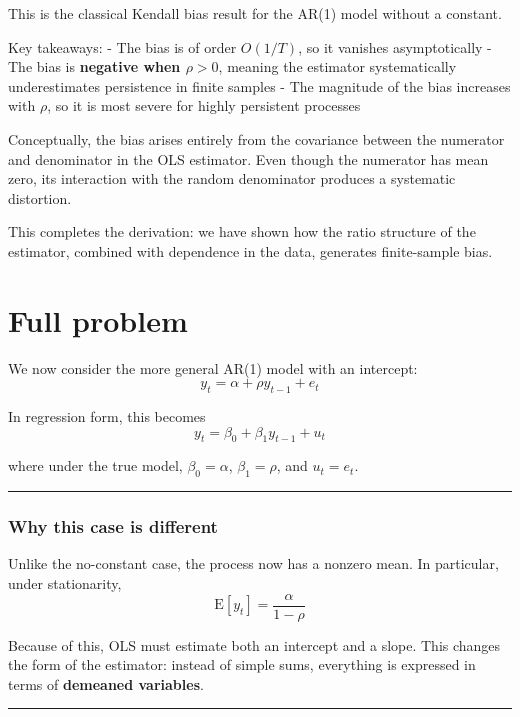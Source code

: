\documentclass[11pt]{article}
\begin{document}
This is the classical Kendall bias result for the AR(1) model without a
constant.

Key takeaways: - The bias is of order \(O(1/T)\), so it vanishes
asymptotically - The bias is \textbf{negative when \(\rho > 0\)},
meaning the estimator systematically underestimates persistence in
finite samples - The magnitude of the bias increases with \(\rho\), so
it is most severe for highly persistent processes

Conceptually, the bias arises entirely from the covariance between the
numerator and denominator in the OLS estimator. Even though the
numerator has mean zero, its interaction with the random denominator
produces a systematic distortion.

This completes the derivation: we have shown how the ratio structure of
the estimator, combined with dependence in the data, generates
finite-sample bias.

    \section{Full problem}\label{full-problem}

We now consider the more general AR(1) model with an intercept: \[
y_t = \alpha+\rho y_{t-1}+e_t
\]

In regression form, this becomes \[
y_t = \beta_0+\beta_1 y_{t-1}+u_t
\]

where under the true model, \(\beta_0 = \alpha\), \(\beta_1 = \rho\),
and \(u_t = e_t\).

\begin{center}\rule{0.5\linewidth}{0.5pt}\end{center}

\subsubsection{Why this case is
different}\label{why-this-case-is-different}

Unlike the no-constant case, the process now has a nonzero mean. In
particular, under stationarity, \[
\text{E}[y_t] = \frac{\alpha}{1-\rho}
\]

Because of this, OLS must estimate both an intercept and a slope. This
changes the form of the estimator: instead of simple sums, everything is
expressed in terms of \textbf{demeaned variables}.

\begin{center}\rule{0.5\linewidth}{0.5pt}\end{center}
\end{document}
